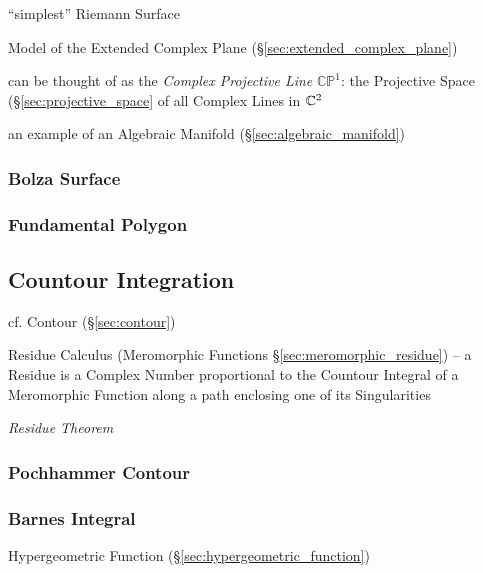 ``simplest'' Riemann Surface

Model of the Extended Complex Plane
(\S\ref{sec:extended_complex_plane})

can be thought of as the \emph{Complex Projective Line}
$\mathbb{CP}^1$: the Projective Space (\S\ref{sec:projective_space} of
all Complex Lines in $\mathbb{C}^2$

an example of an Algebraic Manifold (\S\ref{sec:algebraic_manifold})



\subsubsection{Bolza Surface}\label{sec:bolza_surface}

\subsubsection{Fundamental Polygon}\label{sec:fundamental_polygon}



\subsection{Countour Integration}\label{sec:contour_integration}

cf. Contour (\S\ref{sec:contour})

Residue Calculus (Meromorphic Functions \S\ref{sec:meromorphic_residue}) -- a
Residue is a Complex Number proportional to the Countour Integral of a
Meromorphic Function along a path enclosing one of its Singularities

\emph{Residue Theorem}



\subsubsection{Pochhammer Contour}\label{sec:pochhammer_contour}

\subsubsection{Barnes Integral}\label{sec:barnes_integral}

Hypergeometric Function (\S\ref{sec:hypergeometric_function})



